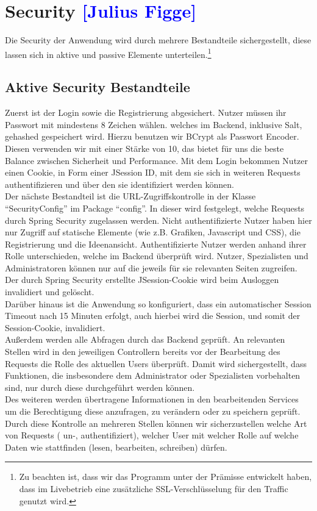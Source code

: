 

\section{Security  \textcolor{blue}{[Julius Figge]}}
\label{Security}

Die Security der Anwendung wird durch mehrere Bestandteile sichergestellt, diese lassen sich in aktive und passive Elemente unterteilen.\footnote{Zu beachten ist, dass wir das Programm unter der Prämisse entwickelt haben, dass im Livebetrieb eine zusätzliche SSL-Verschlüsselung für den Traffic genutzt wird.}

\subsection{Aktive Security Bestandteile}
Zuerst ist der Login sowie die Registrierung abgesichert. Nutzer müssen ihr Passwort mit mindestens 8 Zeichen wählen. welches im Backend, inklusive Salt, gehashed gespeichert wird. Hierzu benutzen wir BCrypt als Passwort Encoder. Diesen verwenden wir mit einer Stärke von 10, das bietet für uns die beste Balance zwischen Sicherheit und Performance. Mit dem Login bekommen Nutzer einen Cookie, in Form einer JSession ID, mit dem sie sich in weiteren Requests authentifizieren und über den sie identifiziert werden können.\\
Der nächste Bestandteil ist die URL-Zugriffskontrolle in der Klasse \enquote{SecurityConfig} im Package \enquote{config}. In dieser wird festgelegt, welche Requests durch Spring Security zugelassen werden. Nicht authentifizierte Nutzer haben hier nur Zugriff auf statische Elemente (wie z.B. Grafiken, Javascript und CSS), die Registrierung und die Ideenansicht.
Authentifizierte Nutzer werden anhand ihrer Rolle unterschieden, welche im Backend überprüft wird. Nutzer, Spezialisten und Administratoren können nur auf die jeweils für sie relevanten Seiten zugreifen.
Der durch Spring Security erstellte JSession-Cookie wird beim Ausloggen invalidiert und gelöscht.\\
Darüber hinaus ist die Anwendung so konfiguriert, dass ein automatischer Session Timeout nach 15 Minuten erfolgt, auch hierbei wird die Session, und somit der Session-Cookie, invalidiert.\\
Außerdem werden alle Abfragen durch das Backend geprüft. An relevanten Stellen wird in den jeweiligen Controllern bereits vor der Bearbeitung des Requests die Rolle des aktuellen Users überprüft. Damit wird sichergestellt, dass Funktionen, die insbesondere dem Administrator oder Spezialisten vorbehalten sind, nur durch diese durchgeführt werden können. \\
Des weiteren werden übertragene Informationen in den bearbeitenden Services um die Berechtigung diese anzufragen, zu verändern oder zu speichern geprüft.\\
Durch diese Kontrolle an mehreren Stellen können wir sicherzustellen welche Art von Requests ( un-, authentifiziert), welcher User mit welcher Rolle auf welche Daten wie stattfinden (lesen, bearbeiten, schreiben) dürfen.\\


